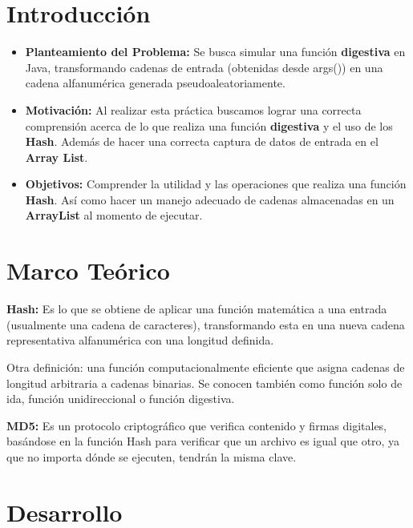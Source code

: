 \documentclass[letterpaper,12pt]{article}
\begin{document}
\tableofcontents
\clearpage

\section{Introducción}

\begin{itemize}
\item \textbf{Planteamiento del Problema:} Se busca simular una función \textbf{digestiva} en Java, transformando cadenas de entrada (obtenidas desde args()) en una cadena alfanumérica generada pseudoaleatoriamente. 

\item \textbf{Motivación:} Al realizar esta práctica buscamos lograr una correcta comprensión acerca de lo que realiza una función \textbf{digestiva} y el uso de los \textbf{Hash}. Además de hacer una correcta captura de datos de entrada en el \textbf{Array List}.

\item \textbf{Objetivos:} Comprender la utilidad y las operaciones que realiza una función \textbf{Hash}. Así como hacer un manejo adecuado de cadenas almacenadas en un \textbf{ArrayList} al momento de ejecutar.

\end{itemize}
\section{Marco Teórico}
\textbf{Hash:} Es lo que se obtiene de aplicar una función matemática a una entrada (usualmente una cadena de caracteres), transformando esta en una nueva cadena representativa alfanumérica con una longitud definida.~\cite{hash}

Otra definición: una función computacionalmente eficiente que asigna cadenas de longitud arbitraria a cadenas binarias. Se conocen también como función solo de ida, función unidireccional o función digestiva.~\cite{Funcion_Digestiva}

\textbf{MD5:} Es un protocolo criptográfico que verifica contenido y firmas digitales, basándose en la función Hash para verificar que un archivo es igual que otro, ya que no importa dónde se ejecuten, tendrán la misma clave.~\cite{MD5}


\section{Desarrollo}
\end{document}

